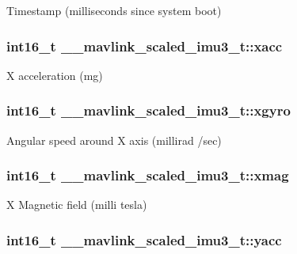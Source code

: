Timestamp (milliseconds since system boot) 

\hypertarget{struct____mavlink__scaled__imu3__t_a718950143ab77de6bf119435f35f7d17}{
\subsubsection[{xacc}]{\setlength{\rightskip}{0pt plus 5cm}int16\+\_\+t \+\_\+\+\_\+mavlink\+\_\+scaled\+\_\+imu3\+\_\+t\+::xacc}}\label{struct____mavlink__scaled__imu3__t_a718950143ab77de6bf119435f35f7d17}


X acceleration (mg) 

\hypertarget{struct____mavlink__scaled__imu3__t_ac7e09e14e4b14756d2ca5a0db5165110}{
\subsubsection[{xgyro}]{\setlength{\rightskip}{0pt plus 5cm}int16\+\_\+t \+\_\+\+\_\+mavlink\+\_\+scaled\+\_\+imu3\+\_\+t\+::xgyro}}\label{struct____mavlink__scaled__imu3__t_ac7e09e14e4b14756d2ca5a0db5165110}


Angular speed around X axis (millirad /sec) 

\hypertarget{struct____mavlink__scaled__imu3__t_a08d29d8a6663027546efcf60cd8203aa}{
\subsubsection[{xmag}]{\setlength{\rightskip}{0pt plus 5cm}int16\+\_\+t \+\_\+\+\_\+mavlink\+\_\+scaled\+\_\+imu3\+\_\+t\+::xmag}}\label{struct____mavlink__scaled__imu3__t_a08d29d8a6663027546efcf60cd8203aa}


X Magnetic field (milli tesla) 

\hypertarget{struct____mavlink__scaled__imu3__t_a34c27262190a9608ccd50f37e09b4397}{
\subsubsection[{yacc}]{\setlength{\rightskip}{0pt plus 5cm}int16\+\_\+t \+\_\+\+\_\+mavlink\+\_\+scaled\+\_\+imu3\+\_\+t\+::yacc}}\label{struct____mavlink__scaled__imu3__t_a34c27262190a9608ccd50f37e09b4397}


